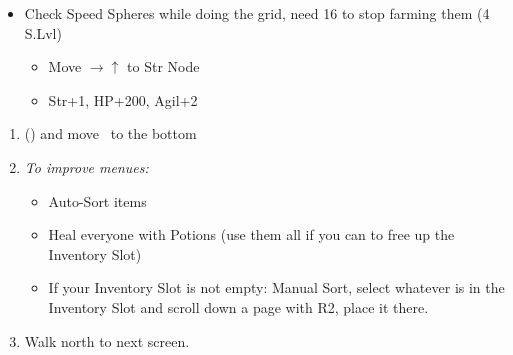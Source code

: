 \begin{spheregrid}
    \begin{itemize}
        \item Check Speed Spheres while doing the grid, need 16 to stop farming them
        \tidusf (4 S.Lvl)
        \begin{itemize}
            \item Move $\rightarrow\uparrow$ to Str Node
            \item Str+1, HP+200, Agil+2
        \end{itemize}
    \end{itemize}
\end{spheregrid}
\begin{enumerate}[resume]
    \item \formation{\tidus}{\wakka}{\auron} (\swap{\yuna}{\auron}) and move \yuna\ to the bottom
    \item \textit{To improve menues:}
    \begin{itemize}
        \item Auto-Sort items
        \item Heal everyone with Potions (use them all if you can to free up the  Inventory Slot)
        \item If your  Inventory Slot is not empty: Manual Sort, select whatever is in the  Inventory Slot and scroll down a page with R2, place it there.
    \end{itemize}
    \item Walk north to next screen.
\end{enumerate}
